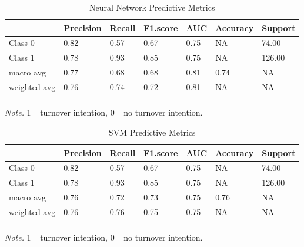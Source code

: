 \documentclass[
  man]{apa7}
\begin{document}
\begin{table}[tbp]

\begin{center}
\begin{threeparttable}

\caption{\label{tab:nn1k}Neural Network Predictive Metrics}

\begin{tabular}{lllllll}
\toprule
 & \multicolumn{1}{c}{Precision} & \multicolumn{1}{c}{Recall} & \multicolumn{1}{c}{F1.score} & \multicolumn{1}{c}{AUC} & \multicolumn{1}{c}{Accuracy} & \multicolumn{1}{c}{Support}\\
\midrule
Class 0 & 0.82 & 0.57 & 0.67 & 0.75 & NA & 74.00\\
Class 1 & 0.78 & 0.93 & 0.85 & 0.75 & NA & 126.00\\
macro avg & 0.77 & 0.68 & 0.68 & 0.81 & 0.74 & NA\\
weighted avg & 0.76 & 0.74 & 0.72 & 0.81 & NA & NA\\
\bottomrule
\addlinespace
\end{tabular}

\begin{tablenotes}[para]
\normalsize{\textit{Note.} 1= turnover intention, 0= no turnover intention.}
\end{tablenotes}

\end{threeparttable}
\end{center}

\end{table}

\begin{table}[tbp]

\begin{center}
\begin{threeparttable}

\caption{\label{tab:svm1k}SVM Predictive Metrics}

\begin{tabular}{lllllll}
\toprule
 & \multicolumn{1}{c}{Precision} & \multicolumn{1}{c}{Recall} & \multicolumn{1}{c}{F1.score} & \multicolumn{1}{c}{AUC} & \multicolumn{1}{c}{Accuracy} & \multicolumn{1}{c}{Support}\\
\midrule
Class 0 & 0.82 & 0.57 & 0.67 & 0.75 & NA & 74.00\\
Class 1 & 0.78 & 0.93 & 0.85 & 0.75 & NA & 126.00\\
macro avg & 0.76 & 0.72 & 0.73 & 0.75 & 0.76 & NA\\
weighted avg & 0.76 & 0.76 & 0.75 & 0.75 & NA & NA\\
\bottomrule
\addlinespace
\end{tabular}

\begin{tablenotes}[para]
\normalsize{\textit{Note.} 1= turnover intention, 0= no turnover intention.}
\end{tablenotes}

\end{threeparttable}
\end{center}

\end{table}
\end{document}
